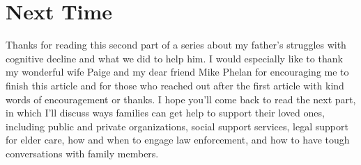 \documentclass{article}
\begin{document}
\section*{Next Time}

Thanks for reading this second part of a series about my father’s struggles with cognitive decline and what we did to help him. I would especially like to thank my wonderful wife Paige and my dear friend Mike Phelan for encouraging me to finish this article and for those who reached out after the first article with kind words of encouragement or thanks. I hope you’ll come back to read the next part, in which I'll discuss ways families can get help to support their loved ones, including public and private organizations, social support services, legal support for elder care, how and when to engage law enforcement, and how to have tough conversations with family members.
\end{document}
